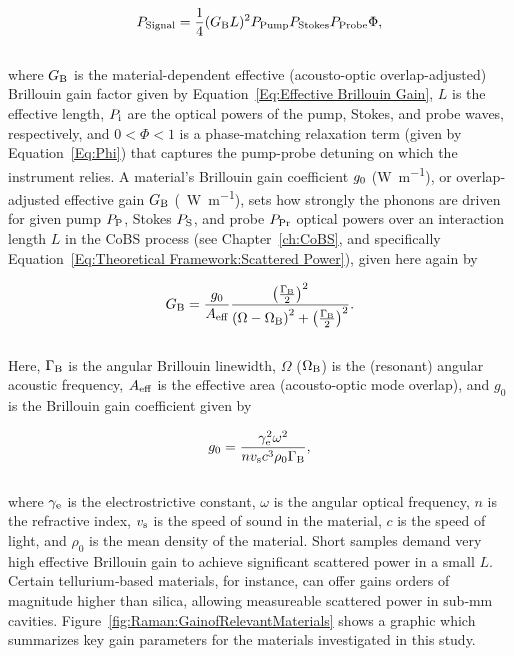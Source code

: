 \begin{equation}
  P_{\rm Signal} = \frac{1}{4}(G_{\rm B}L)^{2}P_{\rm Pump}P_{\rm Stokes}P_{\rm Probe}\Phi,
  \label{eq:Raman:ScatteredPowerPhi}
\end{equation}
\\
where \(G_{\rm B}\) is the material-dependent effective (acousto-optic overlap-adjusted) Brillouin gain factor given by Equation~\ref{Eq:Effective Brillouin Gain}, \(L\) is the effective length, \(P_{\rm i}\) are the optical powers of the pump, Stokes, and probe waves, respectively, and \(0 < \Phi < 1\) is a phase-matching relaxation term (given by Equation~\ref{Eq:Phi}) that captures the pump-probe detuning on which the instrument relies. A material’s Brillouin gain coefficient \(g_{\rm 0}\) (\si{\watt\per\meter}), or overlap‐adjusted effective gain \(G_{\rm B}\) (\si{\per\watt\per\meter}), sets how strongly the phonons are driven for given pump \(P_{\rm P}\), Stokes \(P_{\rm S}\), and probe \(P_{\rm Pr}\) optical powers over an interaction length \(L\) in the \ac{CoBS} process (see Chapter~\ref{ch:CoBS}, and specifically Equation~\ref{Eq:Theoretical Framework:Scattered Power}), given here again by

\begin{equation}
  G_{\rm B} = \frac{g_{0}}{A_{\rm eff}}\frac{\left(\frac{\Gamma_{\rm B}}{2}\right)^{2}}{\left(\Omega - \Omega_{\rm B}\right)^{2} + \left(\frac{\Gamma_{\rm B}}{2}\right)^{2}}.
  \label{eq:Raman:GB}
\end{equation}
\\
Here, \(\Gamma_{\rm B}\) is the angular Brillouin linewidth, \(\Omega\) (\(\Omega_{\rm B}\)) is the (resonant) angular acoustic frequency, \(A_{\rm eff}\) is the effective area (acousto-optic mode overlap), and \(g_{0}\) is the Brillouin gain coefficient given by

\begin{equation}
  g_{0} = \frac{\gamma_{\rm e}^{2}\omega^{2}}{nv_{\rm s}c^{3}\rho_{0}\Gamma_{\rm B}},
  \label{eq:Raman:g0}
\end{equation}
\\
where \(\gamma_{\rm e}\) is the electrostrictive constant, \(\omega\) is the angular optical frequency, \(n\) is the refractive index, \(v_{\rm s}\) is the speed of sound in the material, \(c\) is the speed of light, and \(\rho_{0}\) is the mean density of the material. Short samples demand very high effective Brillouin gain to achieve significant scattered power in a small \(L\). Certain tellurium‐based materials, for instance, can offer gains orders of magnitude higher than silica, \cite{sanghera2010nonlinear, abedin2005observation} allowing measureable scattered power in sub‐\si{\milli\meter} cavities. Figure~\ref{fig:Raman:GainofRelevantMaterials} shows a graphic which summarizes key gain parameters for the materials investigated in this study.


